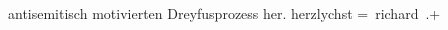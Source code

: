 \begin{ledgroupsized}[t]{13cm}
{{{                  antisemitisch motivierten Dreyfusprozess
                  her.}}}\label{K_L01073_1h} herzlychst \spacefill\mbox{= richard .+}\pend
                     \endnumbering{}\end{ledgroupsized}  \newcommand{\dateiname}{L01073}\newcommand{\titel}{Richard Beer-Hofmann an Arthur Schnitzler, 14. 9. 1900}\newcommand{\editorInnen}{Martin Anton Müller und Gerd-Hermann Susen}
            \footnotesize
\begin{ledgroupsized}[t]{11.5cm}
\end{ledgroupsized}
         
      